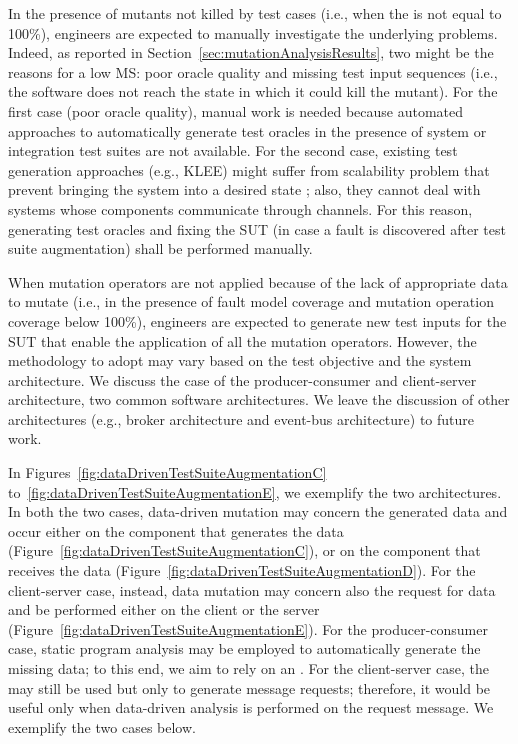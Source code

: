 In the presence of mutants not killed by test cases (i.e., when the   is not equal to 100\%), engineers are expected to manually investigate the underlying problems. Indeed, as reported in Section~\ref{sec:mutationAnalysisResults}, two might be the reasons for a low MS: poor oracle quality and missing test input sequences (i.e., the software does not reach the state in which it could kill the mutant).
For the first case (poor oracle quality), manual work is needed because automated approaches to automatically generate test oracles in the presence of system or integration test suites are not available. For the second case, existing test generation approaches (e.g., KLEE) might suffer from scalability problem that prevent bringing the system into a desired state ; also, they cannot deal with systems whose components communicate through channels. For this reason, generating test oracles and fixing the SUT (in case a fault is discovered after test suite augmentation) shall be performed manually.

When mutation operators are not applied because of the lack of appropriate data to mutate (i.e., in the presence of fault model coverage and mutation operation coverage below 100\%), engineers are expected to generate new test inputs for the SUT that enable the application of all the mutation operators. 
However, the methodology to adopt may vary based on the test objective and the system architecture. 
We discuss the case of the producer-consumer and client-server architecture, two common software architectures. We leave the discussion of other architectures (e.g., broker architecture and event-bus architecture) to future work.

In Figures~\ref{fig:dataDrivenTestSuiteAugmentationC} to~\ref{fig:dataDrivenTestSuiteAugmentationE}, we exemplify the two architectures. In both the two cases, data-driven mutation may concern the generated data and occur either on the component that generates the data (Figure~\ref{fig:dataDrivenTestSuiteAugmentationC}), or on the component that receives the data (Figure~\ref{fig:dataDrivenTestSuiteAugmentationD}).
For the client-server case, instead, data mutation may concern also the request for data and be performed either on the client or the server (Figure~\ref{fig:dataDrivenTestSuiteAugmentationE}). For the producer-consumer case, static program analysis may be employed to automatically generate the missing data; to this end, we aim to rely on an . For the client-server case, the  may still be used but only to generate message requests; therefore, it would be useful only when data-driven analysis is performed on the  request message. We exemplify the two cases below.

